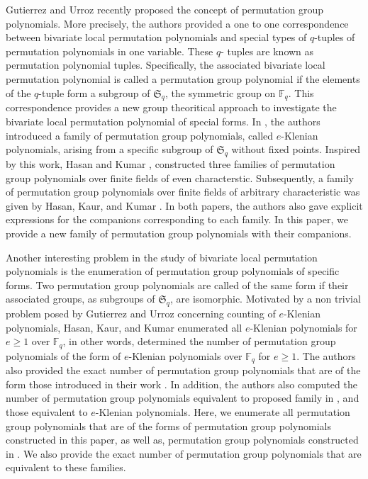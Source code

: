 \documentclass[11pt]{amsart}
\theoremstyle{plain}
\numberwithin{equation}{section}
\def\F{{\mathbb F}}
\begin{document}
Gutierrez and Urroz \cite{JJ_2023} recently proposed the concept of permutation group polynomials. More precisely, the authors provided a one to one correspondence between bivariate local permutation polynomials and special types of $q$-tuples of permutation polynomials in one variable. These $q$- tuples are known as permutation polynomial tuples. Specifically, the associated bivariate local permutation polynomial is called a permutation group polynomial if the elements of the $q$-tuple form a subgroup of $\mathfrak{S}_q$, the symmetric group on $\F_q$. This correspondence provides a new group theoritical approach to investigate the bivariate local permutation polynomial of special forms. In \cite{JJ_2023}, the authors introduced a family of permutation group polynomials, called $e$-Klenian polynomials, arising from a specific  subgroup of $\mathfrak{S}_q$ without fixed points. Inspired by this work, Hasan and Kumar \cite{HK}, constructed three families of permutation group polynomials over finite fields of even characterstic. Subsequently, a family of permutation group polynomials over finite fields of arbitrary characteristic was given by Hasan, Kaur, and Kumar \cite{HKK}. 
In both papers, the authors also gave explicit expressions for the companions corresponding to each family. In this paper, we provide a new family of permutation group polynomials with their companions.


Another interesting problem in the study of bivariate local permutation polynomials is the enumeration of permutation group polynomials of specific forms. Two permutation group polynomials are called of the same form if their associated groups, as subgroups of $\mathfrak{S}_q$, are isomorphic. Motivated by a non trivial problem posed by Gutierrez and Urroz \cite{JJ_2023} concerning counting of $e$-Klenian polynomials, Hasan, Kaur, and Kumar \cite{HKK} enumerated all $e$-Klenian polynomials for $e\ge1$ over $\F_q$, in other words, determined the number of permutation group polynomials of the form of $e$-Klenian polynomials over $\F_q$ for $e\ge 1$.
 The authors also provided the exact number of permutation group polynomials that are of the form those introduced in their work \cite{HKK}. In addition, the authors also computed the number of permutation group polynomials equivalent to proposed family in \cite{HKK}, and those equivalent to $e$-Klenian polynomials. Here, we enumerate all permutation group polynomials that are of the forms of permutation group polynomials constructed in this paper, as well as, permutation group polynomials constructed in \cite{HK}. We also provide the exact number of permutation group polynomials that are equivalent to these families.
\end{document}
